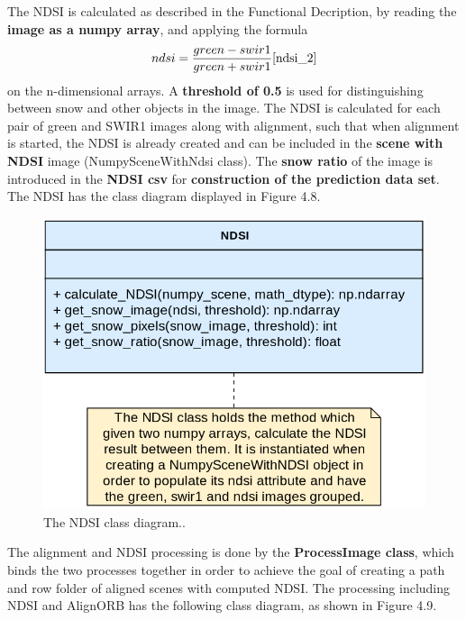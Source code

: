 \documentclass[12pt, a4paper]{report}
\begin{document}
	The NDSI is calculated as described in the Functional Decription, by reading the \textbf{image as a numpy array}, and applying the formula 
	\[ndsi = \frac{green - swir1}{green + swir1}    \cite{ndsi_2}\]
	on the n-dimensional arrays. A \textbf{threshold of 0.5} is used for distinguishing between snow and other objects in the image. The NDSI is calculated for each pair of green and SWIR1 images along with alignment, such that when alignment is started, the NDSI is already created and can be included in the \textbf{scene with NDSI} image (NumpySceneWithNdsi class). The \textbf{snow ratio} of the image is introduced in the \textbf{NDSI csv} for \textbf{construction of the prediction data set}. The NDSI has the class diagram displayed in Figure 4.8. 
	\vskip 0.2cm
	
	\begin{figure}[H]
		\centering
		\includegraphics[scale=1.7]{ndsi_class.png}
		\caption{The NDSI class diagram..}
		\label{fig:ndsi_class}
	\end{figure}

	
	The alignment and NDSI processing is done by the \textbf{ProcessImage class}, which binds the two processes together in order to achieve the goal of creating a path and row folder of aligned scenes with computed NDSI. The processing including NDSI and AlignORB has the following class diagram, as shown in Figure 4.9.
\end{document}
